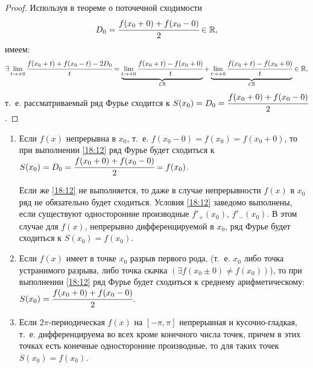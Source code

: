 \documentclass[../../main.tex]{subfiles}
\begin{document}
	
		\begin{proof}
		Используя в теореме о поточечной сходимости
		 \[D_0=\cfrac{f(x_0+0)+f(x_0-0)}{2}\in\mathbb{R},\] имеем:
		\[
		\exists\lim_{t\rightarrow+0}\cfrac{f(x_0+t)+f(x_0-t)-2D_0}{t}=
		\underbrace{\lim_{t\rightarrow+0}\cfrac{f(x_0+t)-f(x_0+0)}{t}}_{\in\mathbb{R}}
		+\underbrace{\lim_{t\rightarrow+0}\cfrac{f(x_0+t)-f(x_0+0)}{t}}_{\in\mathbb{R}}
		\in\mathbb{R},\]
		т.~е. рассматриваемый ряд Фурье сходится к 
		$S(x_0)=D_0=\cfrac{f(x_0+0)+f(x_0-0)}{2}$.
	\end{proof}	
	
	\begin{rems}
		\;
		
		\begin{enumerate}
			\item Если $f(x)$ непрерывна в $x_0$, т.~е.
			 $f(x_0-0)=f(x_0)=f(x_0+0)$, то при выполнении \eqref{18:12}
			ряд Фурье будет сходиться к $S(x_0)=D_0=\cfrac{f(x_0+0)+f(x_0-0)}{2} = 
			f(x_0)$.
			
			Если же \eqref{18:12} не выполняется, то даже в случае
			непрерывности $f(x)$ в $x_0$ ряд не обязательно будет сходиться.
			Условия \eqref{18:12} заведомо выполнены, если существуют 
			односторонние производные $f'_+(x_0)$, $f'_-(x_0)$. В этом случае для 
			$f(x)$, непрерывно дифференцируемой в $x_0$, ряд Фурье будет 
			сходиться к $S(x_0)=f(x_0)$.
			
			\item Если $f(x)$ имеет в точке $x_0$ разрыв первого рода, 
			(т.~е. $x_0$ либо точка устранимого разрыва, либо точка скачка 
			$(\exists f(x_0\pm0)\neq f(x_0))$\;), то при выполнении 
			\eqref{18:12} ряд Фурье будет сходиться к среднему 
			арифметическому: $S(x_0) = \cfrac{f(x_0+0)+f(x_0-0)}{2}$.
			
			\item Если $2\pi$-периодическая $f(x)$ на 
			$\left[-\pi,\pi \right]$ непрерывная и кусочно-гладкая, т.~е.
			дифференцируема во всех кроме конечного числа точек, причем
			в этих точках есть конечные односторонние производные, то для 
			таких точек $S(x_0)=f(x_0)$. 
		\end{enumerate}
	\end{rems}
\end{document}
